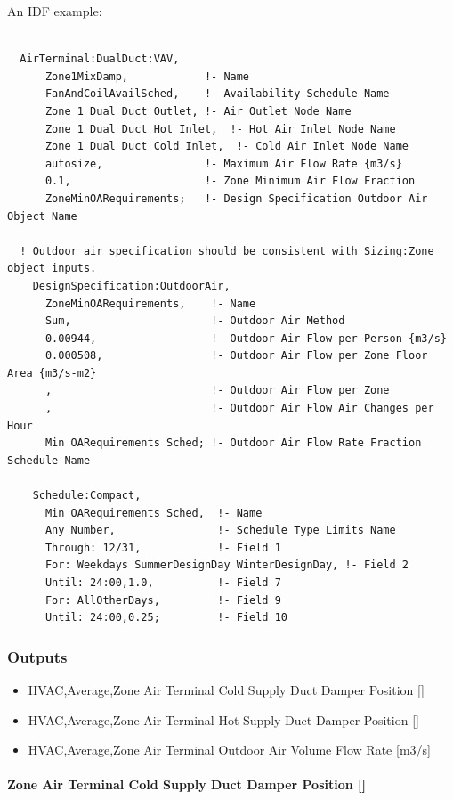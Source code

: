 An IDF example:

\begin{lstlisting}

  AirTerminal:DualDuct:VAV,
      Zone1MixDamp,            !- Name
      FanAndCoilAvailSched,    !- Availability Schedule Name
      Zone 1 Dual Duct Outlet, !- Air Outlet Node Name
      Zone 1 Dual Duct Hot Inlet,  !- Hot Air Inlet Node Name
      Zone 1 Dual Duct Cold Inlet,  !- Cold Air Inlet Node Name
      autosize,                !- Maximum Air Flow Rate {m3/s}
      0.1,                     !- Zone Minimum Air Flow Fraction
      ZoneMinOARequirements;   !- Design Specification Outdoor Air Object Name

  ! Outdoor air specification should be consistent with Sizing:Zone object inputs.
    DesignSpecification:OutdoorAir,
      ZoneMinOARequirements,    !- Name
      Sum,                      !- Outdoor Air Method
      0.00944,                  !- Outdoor Air Flow per Person {m3/s}
      0.000508,                 !- Outdoor Air Flow per Zone Floor Area {m3/s-m2}
      ,                         !- Outdoor Air Flow per Zone
      ,                         !- Outdoor Air Flow Air Changes per Hour
      Min OARequirements Sched; !- Outdoor Air Flow Rate Fraction Schedule Name

    Schedule:Compact,
      Min OARequirements Sched,  !- Name
      Any Number,                !- Schedule Type Limits Name
      Through: 12/31,            !- Field 1
      For: Weekdays SummerDesignDay WinterDesignDay, !- Field 2
      Until: 24:00,1.0,          !- Field 7
      For: AllOtherDays,         !- Field 9
      Until: 24:00,0.25;         !- Field 10
\end{lstlisting}

\subsubsection{Outputs}\label{outputs-13}

\begin{itemize}
\item
  HVAC,Average,Zone Air Terminal Cold Supply Duct Damper Position {[]}
\item
  HVAC,Average,Zone Air Terminal Hot Supply Duct Damper Position {[]}
\item
  HVAC,Average,Zone Air Terminal Outdoor Air Volume Flow Rate {[}m3/s{]}
\end{itemize}

\paragraph{\texorpdfstring{Zone Air Terminal Cold Supply Duct Damper Position {[]}}{Zone Air Terminal Cold Supply Duct Damper Position }}\label{zone-air-terminal-cold-supply-duct-damper-position-1}

